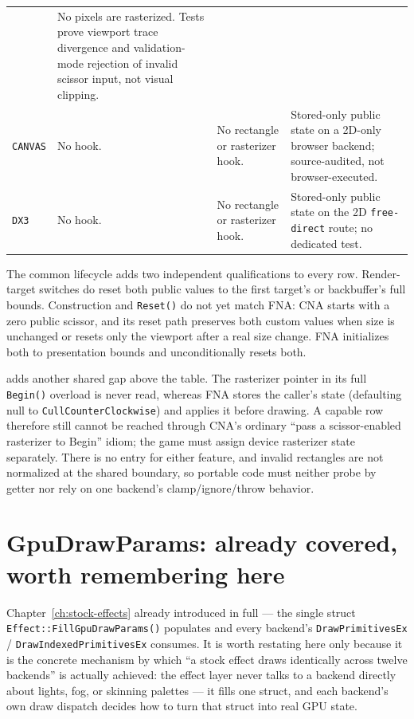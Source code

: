 \begin{longtable}{@{}p{}p{}p{}p{}@{}}
  & No pixels are rasterized. Tests prove viewport trace divergence and validation-mode rejection
    of invalid scissor input, not visual clipping. \\
\texttt{CANVAS}
  & No hook.
  & No rectangle or rasterizer hook.
  & Stored-only public state on a 2D-only browser backend; source-audited, not browser-executed. \\
\texttt{DX3}
  & No hook.
  & No rectangle or rasterizer hook.
  & Stored-only public state on the 2D \texttt{free-direct} route; no dedicated test. \\
\bottomrule
\end{longtable}
\endgroup

The common lifecycle adds two independent qualifications to every row. Render-target switches
do reset both public values to the first target's or backbuffer's full bounds. Construction and
\texttt{Reset()} do not yet match FNA: CNA starts with a zero public scissor, and its reset path
preserves both custom values when size is unchanged or resets only the viewport after a real
size change. FNA initializes both to presentation bounds and unconditionally resets both.

 adds another shared gap above the table. The rasterizer pointer in its
full \texttt{Begin()} overload is never read, whereas FNA
stores the caller's state (defaulting null to \texttt{CullCounterClockwise}) and applies it
before drawing. A capable row therefore still cannot be reached through CNA's ordinary
``pass a scissor-enabled rasterizer to Begin'' idiom; the game must assign device rasterizer
state separately. There is no  entry for either feature, and
invalid rectangles are not normalized at the shared boundary, so portable code must neither
probe by getter nor rely on one backend's clamp/ignore/throw behavior.

\section{GpuDrawParams: already covered, worth remembering here}

Chapter~\ref{ch:stock-effects} already introduced  in full --- the
single struct \texttt{Effect::FillGpuDrawParams()} populates and every backend's
\texttt{DrawPrimitivesEx} / \texttt{DrawIndexedPrimitivesEx} consumes. It is worth restating
here only because it is the concrete mechanism by which ``a stock effect draws identically
across twelve backends'' is actually achieved: the effect layer never talks to a backend
directly about lights, fog, or skinning palettes --- it fills one struct, and each backend's
own draw dispatch decides how to turn that struct into real GPU state.

